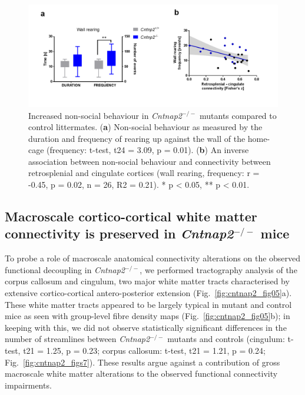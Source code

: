 \begin{figure}[th] 
    \centering
    \includegraphics[scale=0.65]{figures/cntnap2_figure_s6.png}
    \decoRule
    \caption[Increased non-social behaviour in \textit{Cntnap2}$^{-/-}$ mutants compared to
    control littermates.]{Increased non-social behaviour in \textit{Cntnap2}$^{-/-}$ mutants
    compared to control littermates. (\textbf{a}) Non-social behaviour as
    measured by the duration and frequency of rearing up against the wall of the
    home-cage (frequency: t-test, t24 = 3.09, p = 0.01). (\textbf{b}) An inverse
    association between non-social behaviour and connectivity between
    retrosplenial and cingulate cortices (wall rearing, frequency: r = -0.45, p
    = 0.02, n = 26, R2 = 0.21). * p < 0.05, ** p < 0.01.}
    \label{fig:cntnap2_figs6}
\end{figure}

\subsection{Macroscale cortico-cortical white matter connectivity is preserved
in \textit{Cntnap2}$^{-/-}$ mice}

To probe a role of macroscale anatomical connectivity alterations on the
observed functional decoupling in \textit{Cntnap2}$^{-/-}$, we performed tractography analysis
of the corpus callosum and cingulum, two major white matter tracts characterised
by extensive cortico-cortical antero-posterior extension
(Fig.~\ref{fig:cntnap2_fig05}a). These white matter tracts appeared to be
largely typical in mutant and control mice as seen with group-level fibre
density maps (Fig.~\ref{fig:cntnap2_fig05}b); in keeping with this, we did not
observe statistically significant differences in the number of streamlines
between \textit{Cntnap2}$^{-/-}$ mutants and controls (cingulum: t-test, t21 = 1.25, p = 0.23;
corpus callosum: t-test, t21 = 1.21, p = 0.24; Fig.~\ref{fig:cntnap2_figs7}).
These results argue against a contribution of gross macroscale white matter
alterations to the observed functional connectivity impairments.

